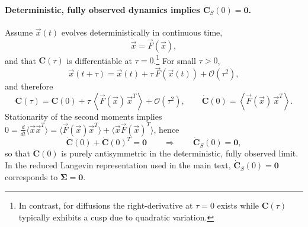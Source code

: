 \documentclass[%
  prl,
  reprint,
  amsmath,
  amssymb,
  aps
]{revtex4-2}
\newcommand{\vvec}[1]{\vec{#1}}
\begin{document}
\paragraph{Deterministic, fully observed dynamics implies $\dot{\bm{C}}_S(0)=\bm{0}$.}
Assume $\vvec{x}(t)$ evolves deterministically in continuous time,
\begin{equation}
\dot{\vvec{x}} = \vvec{F}(\vvec{x}),
\end{equation}
and that $\bm{C}(\tau)$ is differentiable at $\tau=0$.\footnote{In contrast, for diffusions the right-derivative at $\tau=0$ exists while $\bm{C}(\tau)$ typically exhibits a cusp due to quadratic variation.} For small $\tau>0$,
\begin{equation}
\vvec{x}(t+\tau)=\vvec{x}(t)+\tau\,\vvec{F}(\vvec{x}(t)) + \mathcal O(\tau^2),
\end{equation}
and therefore
\begin{equation}
\bm{C}(\tau)=\bm{C}(0)+\tau\,\left\langle \vvec{F}(\vvec{x})\,\vvec{x}^T\right\rangle + \mathcal O(\tau^2),
\qquad
\dot{\bm{C}}(0)=\left\langle \vvec{F}(\vvec{x})\,\vvec{x}^T\right\rangle.
\label{eq:Cdot_det}
\end{equation}
Stationarity of the second moments implies $0=\frac{d}{dt}\langle \vvec{x}\vvec{x}^T\rangle
=\langle \vvec{F}(\vvec{x})\vvec{x}^T\rangle + \langle \vvec{x}\vvec{F}(\vvec{x})^T\rangle$, hence
\begin{equation}
\dot{\bm{C}}(0)+\dot{\bm{C}}(0)^T=\bm{0}
\qquad\Rightarrow\qquad
\dot{\bm{C}}_S(0)=\bm{0},
\label{eq:CdotS_det_zero}
\end{equation}
so that $\dot{\bm{C}}(0)$ is purely antisymmetric in the deterministic, fully observed limit. In the reduced Langevin representation used in the main text, $\dot{\bm{C}}_S(0)=\bm{0}$ corresponds to $\bm{\Sigma}=\bm{0}$.
\end{document}
